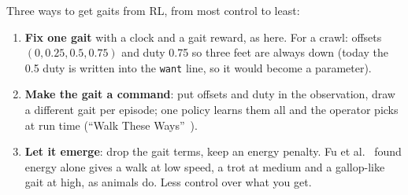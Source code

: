 \documentclass[10pt,letterpaper]{article}
\newcommand{\key}[1]{\textbf{#1}}
\begin{document}
\begin{center}
\end{center}

Three ways to get gaits from RL, from most control to least:
\begin{enumerate}
\item \key{Fix one gait} with a clock and a gait reward, as here. For a crawl: offsets $(0, 0.25, 0.5, 0.75)$ and duty 0.75 so three
feet are always down (today the 0.5 duty is written into the \texttt{want} line, so it would become a parameter).
\item \key{Make the gait a command}: put offsets and duty in the observation, draw a different gait per episode; one policy learns
them all and the operator picks at run time (``Walk These Ways''~\cite{margolis2022}).
\item \key{Let it emerge}: drop the gait terms, keep an energy penalty. Fu et al.~\cite{fu2021} found energy alone gives a walk at low
speed, a trot at medium and a gallop-like gait at high, as animals do. Less control over what you get.
\end{enumerate}
\end{document}

